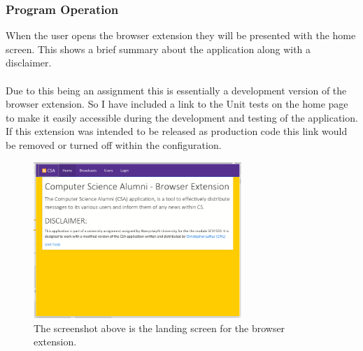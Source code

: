 \documentclass{article}
\begin{document}

\newpage
\subsubsection{Program Operation}

When the user opens the browser extension they will be presented with the home screen. This shows a brief summary about the application along with a disclaimer.\\
\\
Due to this being an assignment this is essentially a development version of the browser extension. So I have included a link to the Unit tests on the home page to make it easily accessible during the development and testing of the application. If this extension was intended to be released as production code this link would be removed or turned off within the configuration.\\

\begin{figure}[H]
\centering
\includegraphics[width=0.7\textwidth]{homepage}
\caption{The screenshot above is the landing screen for the browser extension.}
\end{figure}
\end{document}
